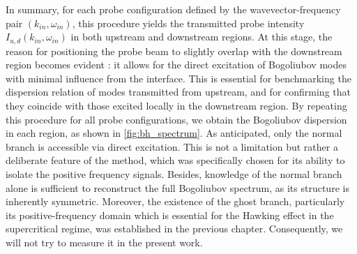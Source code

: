 In summary, for each probe configuration defined by the wavevector-frequency pair \((k_{in}, \omega_{in})\), this procedure yields the transmitted probe intensity \(I_{u,d}(k_{in}, \omega_{in})\) in both upstream and downstream regions.
At this stage, the reason for positioning the probe beam to slightly overlap with the downstream region becomes evident : it allows for the direct excitation of Bogoliubov modes with minimal influence from the interface. This is essential for benchmarking the dispersion relation of modes transmitted from upstream, and for confirming that they coincide with those excited locally in the downstream region.
By repeating this procedure for all probe configurations, we obtain the Bogoliubov dispersion in each region, as shown in \autoref{fig:bh_spectrum}.  As anticipated, only the normal branch is accessible via direct excitation. This is not a limitation but rather a deliberate feature of the method, which was specifically chosen for its ability to isolate the positive frequency signals. 
Besides, knowledge of the normal branch alone is sufficient to reconstruct the full Bogoliubov spectrum, as its structure is inherently symmetric. Moreover, the existence of the ghost branch, particularly its positive-frequency domain which is essential for the Hawking effect in the supercritical regime, was established in the previous chapter. Consequently, we will not try to measure it in the present work.
